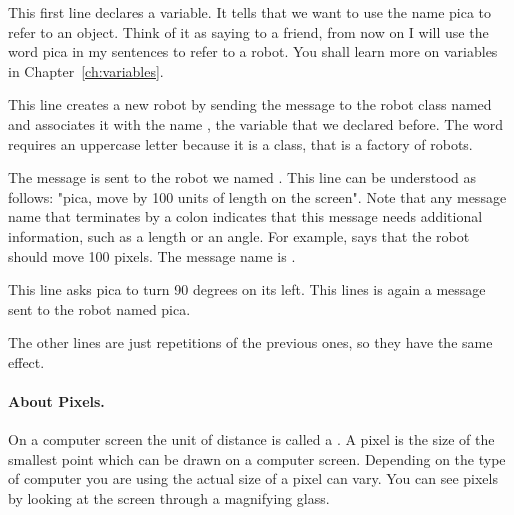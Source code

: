 \begin{description}
\item[] This first line declares a variable. It tells \sq that we want to use the name pica to refer to an object.  Think of it as saying to a friend, from now on I will use the word pica in my sentences to refer to a robot. You shall learn more on variables in Chapter~\ref{ch:variables}.

\item[] This line creates a new robot by sending the message  to the robot class named  and  associates it with the name , the variable that we declared before. The word  requires an uppercase letter  because it is a class, that is a factory of robots.
    
\item[]  The message  is sent to the robot we named . This line can be understood as follows: "pica, move by 100 units of length on the screen". Note that  any message name that terminates by a colon indicates that this message needs additional information, such as a length or an angle. For example,  says that the robot should move 100 pixels. The message name is .

\item[] This line asks pica to turn 90 degrees  on its left. This lines is again a message sent to the robot named pica.
  
\item The other lines are just repetitions of the previous ones, 
so they have the same effect.
\end{description}





\paragraph{About Pixels.} On a computer screen the unit of distance is called a
. A pixel is the size of the smallest
point which can be drawn on a computer screen. Depending on the type
of computer you are using the actual size of a pixel can vary. You can
see pixels by looking at the screen through a magnifying glass.




